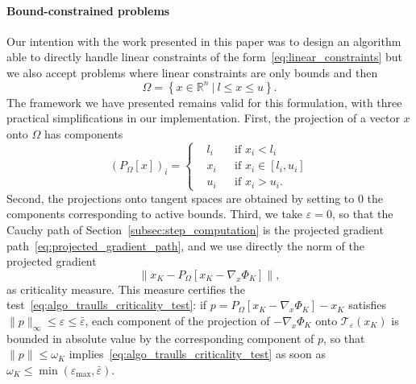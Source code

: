 \documentclass{article}
\numberwithin{equation}{section}
\newcommand{\RR}{{\mathbb{R}}} %
\newcommand{\calT}{{\mathcal{T}}}
\newcommand{\proj}[2]{P_{#1} \left[ {#2} \right]} %
\theoremstyle{plain}
\begin{document}
\paragraph*{Bound-constrained problems}
Our intention with the work presented in this paper was to design an algorithm able to directly handle linear constraints of the form~\eqref{eq:linear_constraints} but we also accept problems where linear constraints are only bounds and then
\[\Omega = \left\{x \in \RR^n \ |\ l \le x \le u\right\}.\]
The framework we have presented remains valid for this formulation, with three practical simplifications in our implementation. First, the projection of a vector $x$ onto $\Omega$ has components
\begin{equation}\label{eq:projection_bounds}
	\left(\proj{\Omega}{x}\right)_i = 
	\left\{ \begin{aligned}
		& l_i & &\text{if } x_i < l_i \\
		& x_i & &\text{if } x_i \in [l_i,u_i] \\
		& u_i & &\text{if } x_i > u_i.
	\end{aligned} \right.
\end{equation}
Second, the projections onto tangent spaces are obtained by setting to $0$ the components corresponding to active bounds. Third, we take $\varepsilon = 0$, so that the Cauchy path of Section~\ref{subsec:step_computation} is the projected gradient path~\eqref{eq:projected_gradient_path}, and we use directly the norm of the projected gradient
\[\left\| x_K - \proj{\Omega}{x_K-\nabla_x\Phi_K}\right\|,\]
as criticality measure. This measure certifies the test~\eqref{eq:algo_traulls_criticality_test}: if $p = \proj{\Omega}{x_K-\nabla_x\Phi_K} - x_K$ satisfies $\|p\|_\infty \le \varepsilon \le \bar\varepsilon$, each component of the projection of $-\nabla_x\Phi_K$ onto $\calT_\varepsilon(x_K)$ is bounded in absolute value by the corresponding component of $p$, so that $\|p\| \le \omega_K$ implies~\eqref{eq:algo_traulls_criticality_test} as soon as $\omega_K \le \min(\varepsilon_{\max},\bar\varepsilon)$.
\end{document}
